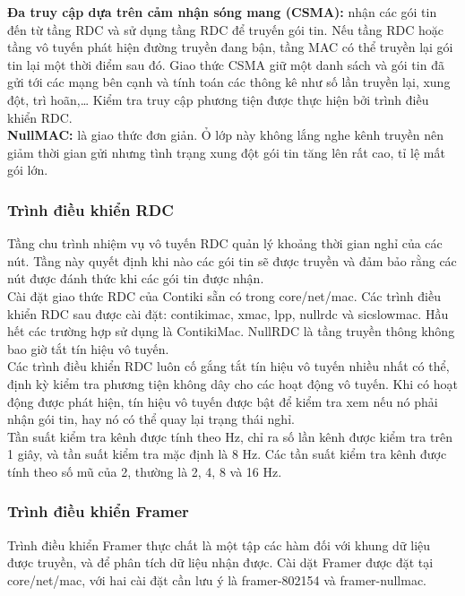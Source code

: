 \documentclass{report}
\begin{document}
\textbf{Đa truy cập dựa trên cảm nhận sóng mang (CSMA):} nhận các gói tin đến từ tầng
RDC và sử dụng tầng RDC để truyến gói tin. Nếu tầng RDC hoặc tầng vô tuyến
phát hiện đường truyền đang bận, tầng MAC có thể truyền lại gói tin lại một thời
điểm sau đó. Giao thức CSMA giữ một danh sách và gói tin đã gửi tới các mạng
bên cạnh và tính toán các thông kê như số lần truyền lại, xung đột, trì hoãn,… Kiểm
tra truy cập phương tiện được thực hiện bởi trình điều khiển RDC. \\

\textbf{NullMAC:} là giao thức đơn giản. Ỏ lớp này không lắng nghe kênh truyền nên giảm thời gian
gửi nhưng tình trạng xung đột gói tin tăng lên rất cao, tỉ lệ mất gói lớn. 
\subsubsection{Trình điều khiển RDC}
Tầng chu trình nhiệm vụ vô tuyến RDC quản lý khoảng thời gian nghỉ của các nút.
Tầng này quyết định khi nào các gói tin sẽ được truyền và đảm bảo rằng các nút
được đánh thức khi các gói tin được nhận. \\

Cài đặt giao thức RDC của Contiki sẵn có trong core/net/mac. Các trình điều khiển
RDC sau được cài đặt: contikimac, xmac, lpp, nullrdc và sicslowmac. Hầu hết các
trường hợp sử dụng là ContikiMac. NullRDC là tầng truyền thông không bao giờ tắt
tín hiệu vô tuyến. \\

Các trình điều khiển RDC luôn cố gắng tắt tín hiệu vô tuyến nhiều nhất có thể, định
kỳ kiểm tra phương tiện không dây cho các hoạt động vô tuyến. Khi có hoạt động
được phát hiện, tín hiệu vô tuyến được bật để kiểm tra xem nếu nó phải nhận gói
tin, hay nó có thể quay lại trạng thái nghỉ. \\

Tần suất kiểm tra kênh được tính theo Hz, chỉ ra số lần kênh được kiểm tra trên 1
giây, và tần suất kiểm tra mặc định là 8 Hz. Các tần suất kiểm tra kênh được tính
theo số mũ của 2, thường là 2, 4, 8 và 16 Hz. 
\subsubsection{Trình điều khiển Framer}
Trình điều khiển Framer thực chất là một tập các hàm đối với khung dữ liệu được
truyền, và để phân tích dữ liệu nhận được. Cài dặt Framer được đặt tại core/net/mac,
với hai cài đặt cần lưu ý là framer-802154 và framer-nullmac. \\
\end{document}
